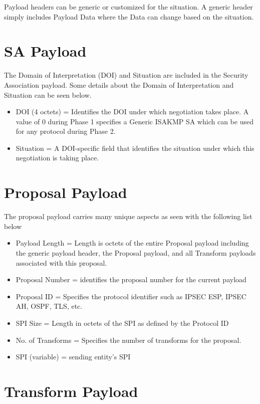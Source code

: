 \documentclass{report}
\begin{document}
Payload headers can be generic or customized for the situation. A generic header simply includes Payload Data where the Data can change based on the situation. 

\section {SA Payload}

The Domain of Interpretation (DOI) and Situation are included in the Security Association payload. Some details about the Domain of Interpretation and Situation can be seen below.

\begin{itemize}
\item DOI (4 octets) = Identifies the DOI under which negotiation takes place. A value of 0 during Phase 1 specifies a Generic ISAKMP SA which can be used for any protocol during Phase 2.
\item Situation = A DOI-specific field that identifies the situation under which this negotiation is taking place. 
\end{itemize}

\section {Proposal Payload}

The proposal payload carries many unique aspects as seen with the following list below

\begin{itemize}
\item Payload Length = Length is octets of the entire Proposal payload including the generic payload header, the Proposal payload, and all Transform payloads associated with this proposal.
\item Proposal Number = identifies the proposal number for the current payload
\item Proposal ID = Specifies the protocol identifier such as IPSEC ESP, IPSEC AH, OSPF, TLS, etc.
\item SPI Size = Length in octets of the SPI as defined by the Protocol ID
\item No. of Transforms = Specifies the number of transforms for the proposal.
\item SPI (variable) = sending entity's SPI
\end{itemize}

\section {Transform Payload}
\end{document}
